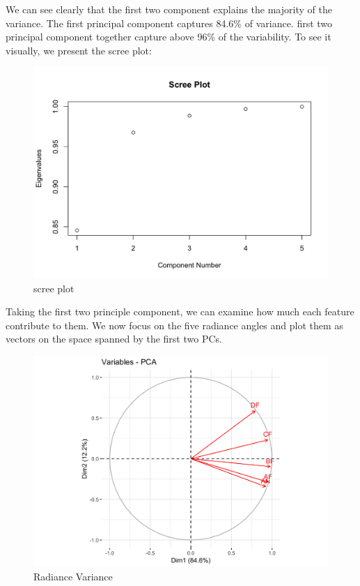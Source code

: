 \documentclass[jou]{apa}%
\begin{document}
We can see clearly that the first two component explains the majority of the variance. The first principal component captures 84.6\% of variance. first two principal component together capture above 96\% of the variability. To see it visually, we present the scree plot:
\vspace*{-0.1cm}\begin{figure}[H]\hspace*{-1cm} \centering\includegraphics[scale=0.15,]{PCAamongradiance-2}\caption{scree plot}\end{figure}
Taking the first two principle component, we can examine how much each feature contribute to them. We now focus on the five radiance angles and plot them as vectors on the space spanned by the first two PCs.
\vspace*{-0.1cm}\begin{figure}[H]\hspace*{-1cm} \centering\includegraphics[scale=0.15,]{PCAamongradiance-1}\caption{Radiance Variance}\end{figure}
\end{document}
